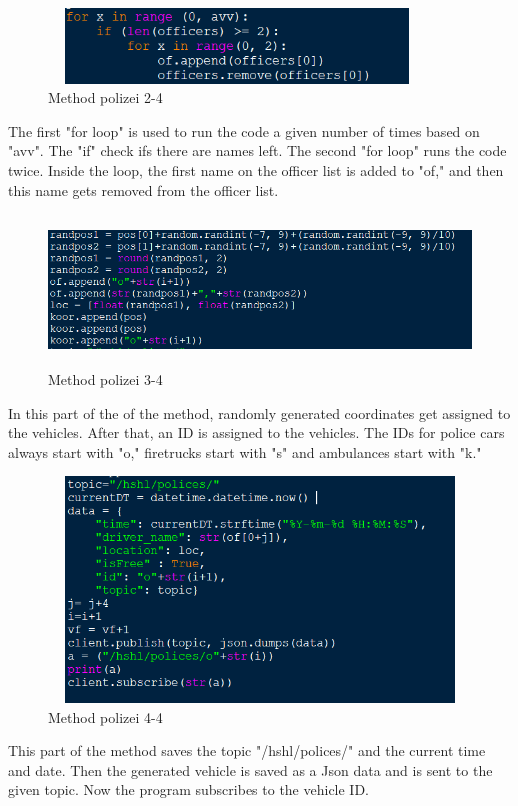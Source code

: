 \documentclass{article}
\begin{document}
\clearpage
\begin{figure}[htp]
    \centering
\includegraphics[width=10cm, height=2cm]{images/Ostrzinski/I2}
   \caption{Method polizei 2-4}
    \label{fig:GALAXY}
\end{figure}
\newline
\newline
The first "for loop" is used to run the code a given number of times based on "avv". 
The "if" check ifs there are names left.
\newline
The second "for loop" runs the code twice. Inside the loop, the first name on the officer list is added to "of," and then this name gets removed from the officer list. 
\newline
\newline
\begin{figure}[htp]
    \centering
\includegraphics[width=12cm, height=4cm]{images/Ostrzinski/I3}
   \caption{Method polizei 3-4}
    \label{fig:GALAXY}
\end{figure}
\newline
\newline
In this part of the of the method, randomly generated coordinates get assigned to the vehicles.
After that, an ID is assigned to the vehicles. The IDs for police cars always start with "o,"  firetrucks start with "s" and ambulances start with "k."

\clearpage
\begin{figure}[htp]
    \centering
\includegraphics[width=12cm, height=6cm]{images/Ostrzinski/I4}
   \caption{Method polizei 4-4}
    \label{fig:GALAXY}
\end{figure}
\newline
\newline
This part of the method saves the topic "/hshl/polices/" and the current time and date.
Then the generated vehicle is saved as a Json data and is sent to the given topic.
Now the program subscribes to the vehicle ID. 
\end{document}
